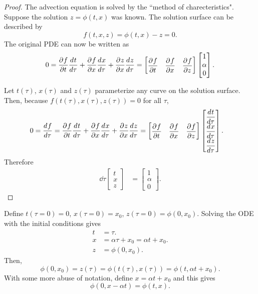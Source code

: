 \documentclass{doc}
\begin{document}
\begin{proof}
The advection equation is solved by the ``method of charecteristics".
Suppose the solution $z=\phi(t,x)$ was known.  The solution surface can
be described by
\begin{equation}
    f(t,x,z) = \phi(t,x) - z = 0.
\end{equation}
The original PDE can now be written as
\begin{equation}
0 = \dfrac{\partial^{} {f}}{\partial {t}^{} } \dfrac{d^{} {t}}{d {\tau}^{} } + \dfrac{\partial^{} {f}}{\partial {x}^{} } \dfrac{d^{} {x}}{d {\tau}^{} } + \dfrac{\partial^{} {z}}{\partial {x}^{} } \dfrac{d^{} {z}}{d {\tau}^{} }
    = \begin{bmatrix}
        \dfrac{\partial^{} {f}}{\partial {t}^{} } & \dfrac{\partial^{} {f}}{\partial {x}^{} } & \dfrac{\partial^{} {f}}{\partial {z}^{} }
    \end{bmatrix}
    \begin{bmatrix}
        1 \\
        \alpha \\
        0
    \end{bmatrix}.
\end{equation}

Let $t(\tau)$, $x(\tau)$ and $z(\tau)$ parameterize any curve on the solution 
surface.  Then, because $f(t(\tau),x(\tau),z(\tau))=0$ for all $\tau$,
\begin{align}
    0 &= \dfrac{d^{} {f}}{d {\tau}^{} } = \dfrac{\partial^{} {f}}{\partial {t}^{} } \dfrac{d^{} {t}}{d {\tau}^{} } + \dfrac{\partial^{} {f}}{\partial {x}^{} } \dfrac{d^{} {x}}{d {\tau}^{} } + \dfrac{\partial^{} {z}}{\partial {x}^{} } \dfrac{d^{} {z}}{d {\tau}^{} }
    = \begin{bmatrix}
        \dfrac{\partial^{} {f}}{\partial {t}^{} } & \dfrac{\partial^{} {f}}{\partial {x}^{} } & \dfrac{\partial^{} {f}}{\partial {z}^{} }
    \end{bmatrix}
    \begin{bmatrix}
        \dfrac{d^{} {t}}{d {\tau}^{} } \\
        \dfrac{d^{} {x}}{d {\tau}^{} } \\
        \dfrac{d^{} {z}}{d {\tau}^{} }
    \end{bmatrix}.
\end{align}
Therefore 
\begin{align}
    \dd{}{\tau} \begin{bmatrix}
        t \\
        x \\
        z
    \end{bmatrix} &= 
    \begin{bmatrix}
        1 \\
        \alpha \\
        0
    \end{bmatrix}.
\end{align}
\end{proof}
Define $t(\tau=0)=0$, $x(\tau=0)=x_0$, $z(\tau=0)=\phi(0,x_0)$.
Solving the ODE with the initial conditions gives
\begin{align}
    t &= \tau. \\
    x &= \alpha \tau + x_0= \alpha t + x_0. \\
    z &= \phi(0,x_0).
\end{align}
Then,
\begin{equation}
    \phi(0, x_0) = z(\tau) = \phi(t(\tau),x(\tau)) = \phi(t,\alpha t + x_0).
\end{equation}
With some more abuse of notation, define $x=\alpha t+x_0$ and this gives
\begin{equation}
    \phi(0, x-\alpha t) = \phi(t,x).
\end{equation}
\end{document}
